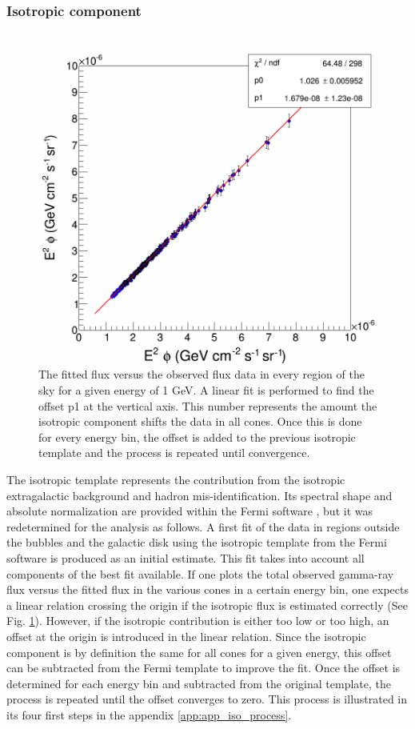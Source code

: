 \subsubsection{Isotropic component}

\begin{figure}
 \centering
 \includegraphics[width=.5\linewidth]{pic/method/iso_calibration.png}
 \caption[Isotropic calibration.]{The fitted flux versus the observed flux data in every region of the sky for a given energy of 1 GeV. A linear fit is performed to find the offset p1 at the vertical axis. This number represents the amount the isotropic component shifts the data in all cones. Once this is done for every energy bin, the offset is added to the previous isotropic template and the process is repeated until convergence. }
 \label{fig:iso_calibration}
\end{figure}


The isotropic template represents the contribution from the isotropic extragalactic background and hadron mis-identification. Its spectral shape and absolute normalization are provided within the Fermi software \cite{FermiTools}, but it was redetermined for the analysis as follows.
A first fit of the data in regions outside the bubbles and the galactic disk using the isotropic template from the Fermi software is produced as an initial estimate. This fit takes into account all components of the best fit available.
If one plots the total observed gamma-ray flux versus the fitted flux in the various cones in a certain energy bin, one expects a linear relation crossing the origin if the isotropic flux is estimated correctly (See Fig. \ref{fig:iso_calibration}). However, if the isotropic contribution is either too low or too high, an offset at the origin is introduced in the linear relation. Since the isotropic component is by definition the same for all cones for a given energy, this offset can be subtracted from the Fermi template to improve the fit. 
Once the offset is determined for each energy bin and subtracted from the original template, the process is repeated until the offset converges to zero. This process is illustrated in its four first steps in the appendix \ref{app:app_iso_process}.


